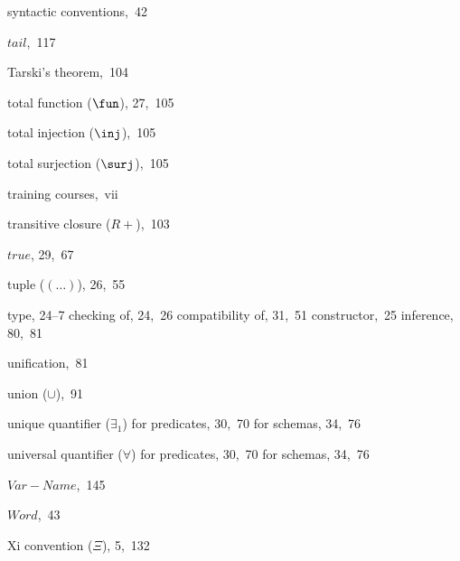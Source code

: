 \begin{theindex}
\item syntactic conventions,~42
\indexspace %
\item $tail$,~117
\item Tarski's theorem,~104
\item total function ($\fun$), 27,~105
\item total injection ($\inj$),~105
\item total surjection ($\surj$),~105
\item training courses,~vii
\item transitive closure ($R \plus$),~103
\item $true$, 29,~67
\item tuple ($(\ldots)$), 26,~55
\item type, 24--7
  \subitem checking of, 24,~26
  \subitem compatibility of, 31,~51
  \subitem constructor,~25
  \subitem inference, 80,~81
\indexspace %
\item unification,~81
\item union ($\cup$),~91
\item unique quantifier ($\exists_1$)
  \subitem for predicates, 30,~70
  \subitem for schemas, 34,~76
\item universal quantifier ($\forall$)
  \subitem for predicates, 30,~70
\indexbreak
  \subitem for schemas, 34,~76
\indexspace %
\item \(Var-Name\),~145
\indexspace %
\item \(Word\),~43
\indexspace %
\item Xi convention ($\Xi$), 5,~132
\end{theindex}


